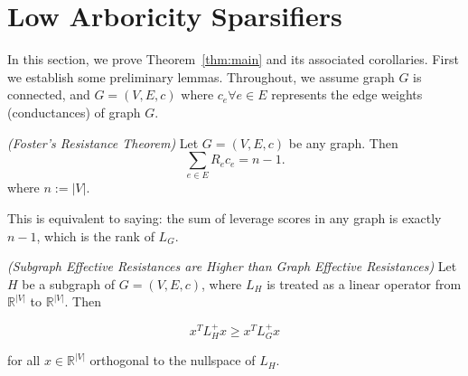 \section{Low Arboricity Sparsifiers}\label{sec:main}

In this section, we prove Theorem~\ref{thm:main} and its associated
corollaries. First we establish some preliminary lemmas. Throughout, we assume graph
$G$ is connected, and $G = (V, E, c)$ where $c_e \forall e \in E$
represents the edge weights (conductances) of graph $G$. 
\begin{lemma} \label{foster}
\textit{(Foster's Resistance Theorem)} Let $G = (V, E, c)$ be any graph. Then 
\begin{equation}
\sum_{e \in E} R_ec_e = n-1.
\end{equation}
where $n:=|V|$. 
\end{lemma}
This is equivalent to saying: the sum of leverage scores in any graph is
exactly $n-1$, which is the rank of $L_G$.

\begin{lemma} \label{lem:monotone}
\textit{(Subgraph Effective Resistances are Higher than Graph Effective
    Resistances)} Let $H$ be a subgraph of $G = (V, E, c)$, where $L_H$ is treated as a linear operator from $\mathbb{R}^{|V|}$ to $\mathbb{R}^{|V|}$. Then

\begin{equation}\label{lem} 
x^T L_H^+ x \geq x^T L_G^+ x
\end{equation}

for all $x \in \mathbb{R}^{|V|}$ orthogonal to the nullspace of $L_H$. 

\end{lemma}

